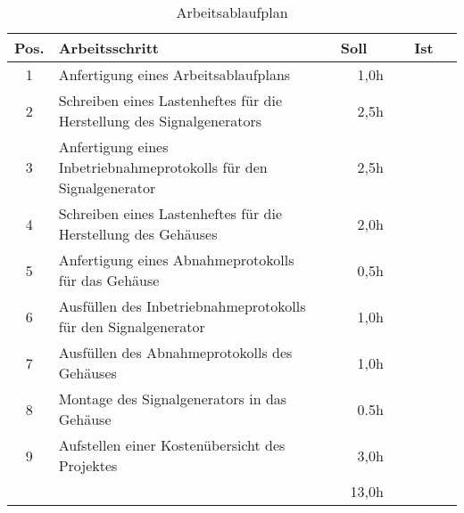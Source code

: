 \begin{sidewaystable}

\caption{Arbeitsablaufplan}

\begin{tabular}{lp{15cm}|r|r|}
\hline
\multicolumn{1}{|c|}{Pos.} & Arbeitsschritt & ~~Soll~~ & ~~Ist~~ \\ \hline
\multicolumn{1}{|c|}{1} & Anfertigung eines Arbeitsablaufplans & 1,0h &  \\ \hline
\multicolumn{1}{|c|}{2} & Schreiben eines Lastenheftes für die Herstellung des Signalgenerators & 2,5h &  \\ \hline
\multicolumn{1}{|c|}{3} & Anfertigung eines Inbetriebnahmeprotokolls für den Signalgenerator & 2,5h &  \\ \hline
\multicolumn{1}{|c|}{4} & Schreiben eines Lastenheftes für die Herstellung des Gehäuses & 2,0h &  \\ \hline
\multicolumn{1}{|c|}{5} & Anfertigung eines Abnahmeprotokolls für das Gehäuse & 0,5h &  \\ \hline
\multicolumn{1}{|c|}{6} & Ausfüllen des Inbetriebnahmeprotokolls für den Signalgenerator & 1,0h &  \\ \hline
\multicolumn{1}{|c|}{7} & Ausfüllen des Abnahmeprotokolls des Gehäuses & 1,0h &  \\ \hline
\multicolumn{1}{|c|}{8} & Montage des Signalgenerators in das Gehäuse & 0.5h &  \\ \hline
\multicolumn{1}{|c|}{9} & Aufstellen einer Kostenübersicht des Projektes & 3,0h &  \\ \hline
                       &  & 13,0h &  \\ \cline{3-4} 
\end{tabular}
 \end{sidewaystable}
